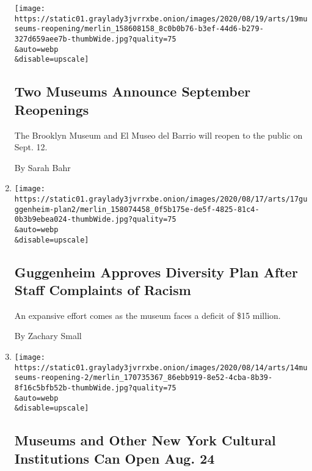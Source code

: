 \begin{enumerate}
  \texttt{[image: https://static01.graylady3jvrrxbe.onion/images/2020/08/19/arts/19museums-reopening/merlin\_158608158\_8c0b0b76-b3ef-44d6-b279-327d659aee7b-thumbWide.jpg?quality=75\\\&auto=webp\\\&disable=upscale]}

  \hypertarget{two-museums-announce-september-reopenings}{%
  \subsection{Two Museums Announce September
  Reopenings}\label{two-museums-announce-september-reopenings}}

  The Brooklyn Museum and El Museo del Barrio will reopen to the public
  on Sept. 12.

  By Sarah Bahr
\item
  \href{/2020/08/17/arts/design/guggenheim-diversity-plan-racism.html}{}

  \texttt{[image: https://static01.graylady3jvrrxbe.onion/images/2020/08/17/arts/17guggenheim-plan2/merlin\_158074458\_0f5b175e-de5f-4825-81c4-0b3b9ebea024-thumbWide.jpg?quality=75\\\&auto=webp\\\&disable=upscale]}

  \hypertarget{guggenheim-approves-diversity-plan-after-staff-complaints-of-racism}{%
  \subsection{Guggenheim Approves Diversity Plan After Staff Complaints
  of
  Racism}\label{guggenheim-approves-diversity-plan-after-staff-complaints-of-racism}}

  An expansive effort comes as the museum faces a deficit of \$15
  million.

  By Zachary Small
\item
  \href{/2020/08/14/arts/design/nyc-museums-reopening-covid-19.html}{}

  \texttt{[image: https://static01.graylady3jvrrxbe.onion/images/2020/08/14/arts/14museums-reopening-2/merlin\_170735367\_86ebb919-8e52-4cba-8b39-8f16c5bfb52b-thumbWide.jpg?quality=75\\\&auto=webp\\\&disable=upscale]}

  \hypertarget{museums-and-other-new-york-cultural-institutions-can-open-aug-24}{%
  \subsection{Museums and Other New York Cultural Institutions Can Open
  Aug.
  24}\label{museums-and-other-new-york-cultural-institutions-can-open-aug-24}}


\end{enumerate}
